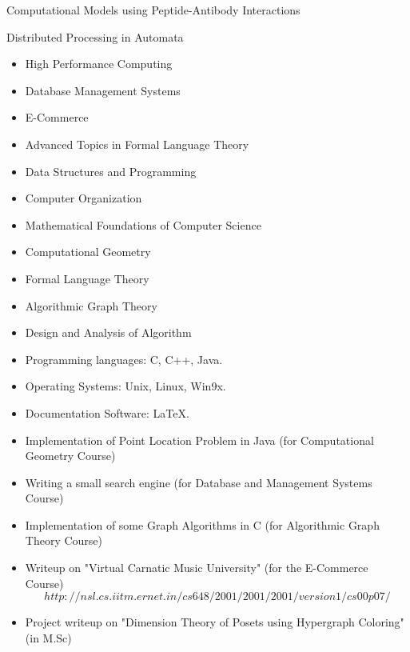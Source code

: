 \documentclass[11pt]{article}
\begin{document}
Computational Models using
Peptide-Antibody Interactions

\vspace{0.4cm}

Distributed Processing in Automata 

\vspace{0.4cm}

\begin{itemize}
\item High Performance Computing
\item Database Management Systems
\item E-Commerce
\item Advanced Topics in Formal Language Theory
\item Data Structures and Programming
\item Computer Organization
\item Mathematical Foundations of Computer Science
\item Computational Geometry
\item Formal Language Theory
\item Algorithmic Graph Theory
\item Design and Analysis of Algorithm
\end{itemize}
\vspace{0.4cm}

\begin{itemize}
\item Programming languages: C, C++, Java.
\item Operating Systems: Unix, Linux, Win9x.
\item Documentation Software: \LaTeX .
\end{itemize}

\vspace{0.4cm}

\begin{itemize}
\item Implementation of Point Location Problem in Java (for
    Computational Geometry Course)
\item Writing a small search engine (for Database and Management
    Systems Course)
\item Implementation of some Graph Algorithms in C (for Algorithmic Graph Theory Course)
\item Writeup on "Virtual Carnatic Music University" (for the E-Commerce
    Course)
    \[http://nsl.cs.iitm.ernet.in/cs648/2001/2001/2001/version1/cs00p07/\]
\item Project writeup on "Dimension Theory of Posets using Hypergraph
    Coloring" (in M.Sc)
\end{itemize}
\end{document}
